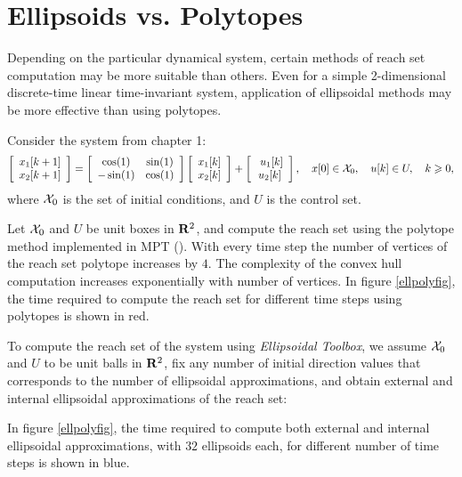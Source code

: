 \section{Ellipsoids vs. Polytopes}
Depending on the particular dynamical system, certain methods of
reach set computation may be more suitable than others.
Even for a simple 2-dimensional discrete-time linear time-invariant
system, application of ellipsoidal methods may be more effective
than using polytopes.

Consider the system from chapter 1:
\[ \left[\begin{array}{c}
x_1[k+1]\\
x_2[k+1]\end{array}\right] = \left[\begin{array}{cc}
\cos(1) & \sin(1)\\
-\sin(1) & \cos(1)\end{array}\right]\left[\begin{array}{c}
x_1[k]\\
x_2[k]\end{array}\right] + \left[\begin{array}{c}\
u_1[k]\\
u_2[k]\end{array}\right], ~~~ x[0]\in\XX_0, ~~~ u[k]\in U, ~~~ k\geq0, \]
where $\XX_0$ is the set of initial conditions, and $U$ is the control set.

Let $\XX_0$ and $U$ be unit boxes in ${\bf R}^2$, and compute the reach set
using the polytope method implemented in MPT (\cite{MULTI_PARAMETRIC_TOOLBOX_HOMEPAGE}). With every time step
the number of vertices of the reach set polytope increases by $4$.
The complexity of the
convex hull computation increases exponentially with number of vertices.
In figure \ref{ellpolyfig}, the time required to compute the reach set
for different time steps using polytopes is shown in red.

To compute the reach set of the system using {\it Ellipsoidal Toolbox},
we assume $\XX_0$ and $U$ to be unit balls in ${\bf R}^2$, fix any number
of initial direction values that corresponds to the number of ellipsoidal
approximations, and obtain external and internal ellipsoidal approximations
of the reach set:

In figure \ref{ellpolyfig}, the time required to compute both external
and internal ellipsoidal approximations, with $32$ ellipsoids each,
for different number of time steps is shown in blue.


